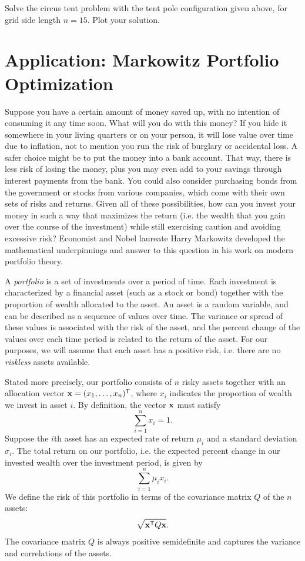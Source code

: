 \begin{problem}
Solve the circus tent problem with the tent pole configuration given above, for grid side length $n = 15$.
Plot your solution.
\end{problem}

\section*{Application: Markowitz Portfolio Optimization}
Suppose you have a certain amount of money saved up, with no intention of consuming it any time soon.
What will you do with this money?
If you hide it somewhere in your living quarters or on your person, it will lose value over time due to inflation, not to mention you run the risk of burglary or accidental loss.
A safer choice might be to put the money into a bank account.
That way, there is less risk of losing the money, plus you may even add to your savings through interest payments from the bank.
You could also consider purchasing bonds from the government or stocks from various companies, which come with their own sets of risks and returns.
Given all of these possibilities, how can you invest your money in such a way that maximizes the return (i.e. the wealth that you gain over the course of the investment) while still exercising caution and avoiding excessive risk?
Economist and Nobel laureate Harry Markowitz developed the mathematical underpinnings and answer to this question in his work on modern portfolio theory.

A \emph{portfolio} is a set of investments over a period of time.
Each investment is characterized by a financial asset (such as a stock or bond) together with the proportion of wealth allocated to the asset.
An asset is a random variable, and can be described as a sequence of values over time.
The variance or spread of these values is associated with the risk of the asset, and the percent change of the values over each time period is related to the return of the asset.
For our purposes, we will assume that each asset has a positive risk, i.e. there are no \emph{riskless} assets available.

Stated more precisely, our portfolio consists of $n$ risky assets together with an allocation vector
$\mathbf{x} = (x_1,\ldots,x_n)^{\mathsf T} $, where $x_i$ indicates the proportion of wealth we invest in asset $i$.
By definition, the vector $\mathbf{x}$ must satisfy \[\sum_{i=1}^n x_i = 1.\]
Suppose the $i$th asset has an expected rate of return $\mu_i$ and a standard deviation $\sigma_i$.
The total return on our portfolio, i.e. the expected percent change in our invested wealth over the investment period, is given by
\[\sum_{i=1}^n \mu_ix_i.\]
We define the risk of this portfolio in terms of the covariance matrix $Q$ of the $n$ assets: \[\sqrt{\mathbf{x}^{\mathsf T}  Q \mathbf{x}}.\]
The covariance matrix $Q$ is always positive semidefinite and captures the variance and correlations of the assets.

